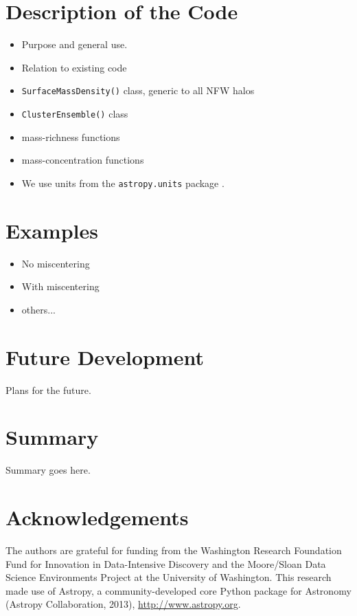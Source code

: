 \documentclass[iop]{emulateapj}
\begin{document}
\section{Description of the Code}
\label{code}

\begin{itemize} \itemsep -2pt
\item Purpose and general use.
\item Relation to existing code
\item \lstinline{SurfaceMassDensity()} class, generic to all NFW halos
\item \lstinline{ClusterEnsemble()} class
\item mass-richness functions
\item mass-concentration functions
\item We use units from the \lstinline{astropy.units} package \citep{astropy13}.
\end{itemize}

\section{Examples}
\label{ex}

\begin{itemize} \itemsep -2pt
\item No miscentering
\item With miscentering
\item others...
\end{itemize}

\section{Future Development}
\label{future}

Plans for the future.

\section{Summary}
\label{summary}

Summary goes here.


\section*{Acknowledgements}
The authors are grateful for funding from the Washington Research Foundation Fund for Innovation in Data-Intensive Discovery and the Moore/Sloan Data Science Environments Project at the University of Washington. This research made use of Astropy, a community-developed core Python package for Astronomy (Astropy Collaboration, 2013), \url{http://www.astropy.org}.




\end{document}
